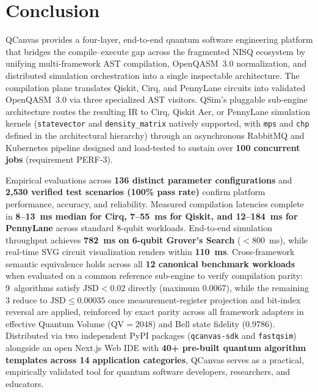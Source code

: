 \documentclass[runningheads]{llncs}
\begin{document}

\section{Conclusion}

QCanvas provides a four-layer, end-to-end quantum software engineering platform that bridges the compile--execute gap across the fragmented NISQ ecosystem by unifying multi-framework AST compilation, OpenQASM~3.0 normalization, and distributed simulation orchestration into a single inspectable architecture. The compilation plane translates Qiskit, Cirq, and PennyLane circuits into validated OpenQASM~3.0 via three specialized AST visitors. QSim's pluggable sub-engine architecture routes the resulting IR to Cirq, Qiskit Aer, or PennyLane simulation kernels (\texttt{statevector} and \texttt{density\_matrix} natively supported, with \texttt{mps} and \texttt{chp} defined in the architectural hierarchy) through an asynchronous RabbitMQ and Kubernetes pipeline designed and load-tested to sustain over \textbf{100 concurrent jobs} (requirement PERF-3).

Empirical evaluations across \textbf{136 distinct parameter configurations} and \textbf{2,530 verified test scenarios (100\% pass rate)} confirm platform performance, accuracy, and reliability. Measured compilation latencies complete in \textbf{8--13~ms median for Cirq, 7--55~ms for Qiskit, and 12--184~ms for PennyLane} across standard 8-qubit workloads. End-to-end simulation throughput achieves \textbf{782~ms on 6-qubit Grover's Search} ($<800$~ms), while real-time SVG circuit visualization renders within \textbf{110~ms}. Cross-framework semantic equivalence holds across all \textbf{12 canonical benchmark workloads} when evaluated on a common reference sub-engine to verify compilation parity: 9~algorithms satisfy $\text{JSD} < 0.02$ directly (maximum 0.0067), while the remaining 3 reduce to $\text{JSD} \le 0.00035$ once measurement-register projection and bit-index reversal are applied, reinforced by exact parity across all framework adapters in effective Quantum Volume ($\text{QV} = 2048$) and Bell state fidelity ($0.9786$). Distributed via two independent PyPI packages (\texttt{qcanvas-sdk} and \texttt{fastqsim}) alongside an open Next.js Web IDE with \textbf{40+ pre-built quantum algorithm templates across 14 application categories}, QCanvas serves as a practical, empirically validated tool for quantum software developers, researchers, and educators.
\end{document}
